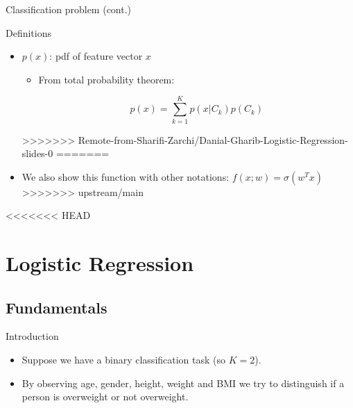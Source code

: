 \documentclass[serif, aspectratio=169]{beamer}
\begin{document}
\begin{frame}{Classification problem (cont.)}
\begin{itemize}
\begin{frame}{Definitions}
\begin{itemize}
        \item $p(x)$: pdf of feature vector $x$ 
            \begin{itemize}
                \item From total probability theorem:   
                
                \[ p(x)=\sum_{k=1}^{K}p(x|C_k)p(C_k)
                \]
            \end{itemize}
        
>>>>>>> Remote-from-Sharifi-Zarchi/Danial-Gharib-Logistic-Regression-slides-0
=======
        \item We also show this function with other notations: $f(x;w)= \sigma (w^Tx)$
>>>>>>> upstream/main
    \end{itemize}
\end{frame}



<<<<<<< HEAD
\section{Logistic Regression}

\subsection{Fundamentals}


\begin{frame}{Introduction}
    \begin{itemize}
        \item Suppose we have a binary classification task (so $K=2$).
        \item By observing \textcolor{deepred}{age}, \textcolor{deepred}{gender}, \textcolor{deepred}{height}, \textcolor{deepred}{weight} and \textcolor{deepred}{BMI} we try to distinguish if a person is \textcolor{deepgreen}{overweight} or \textcolor{deepgreen}{not overweight}.
        

\end{itemize}
\end{frame}
\end{itemize}
\end{frame}
\end{document}
